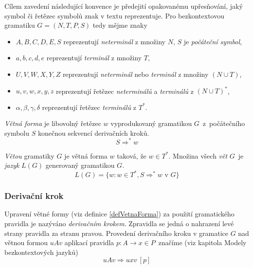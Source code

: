 \begin{konvence}
  Cílem zavedení následující konvence je předejití opakovanému upřesňování, jaký symbol či řetězec symbolů znak v textu reprezentuje.
  Pro bezkontextovou gramatiku $G = (N, T, P, S)$ tedy mějme znaky
  \begin{itemize}
    \item $A, B, C, D, E, S$ reprezentují \emph{neterminál} z množiny $N$, $S$ je \emph{počáteční symbol},
    \item $a, b, c, d, e$ reprezentují \emph{terminál} z množiny $T$,
    \item $U, V, W, X, Y, Z$ reprezentují \emph{neterminál} nebo \emph{terminál} z množiny $(N \cup T)$,
    \item $u, v, w, x, y, z$ reprezentují řetězec \emph{neterminálů} a \emph{terminálů} z $(N \cup T)^*$,
    \item $\alpha, \beta, \gamma, \delta$ reprezentují řetězec \emph{terminálů} z $T^*$.
  \end{itemize}
\end{konvence}

\begin{definice} \label{defVetnaForma}
  \emph{Větná forma} je libovolný řetězec $w$ vyprodukovaný gramatikou $G$~z~počátečního symbolu $S$ konečnou sekvencí derivačních kroků.
  $$S\Rightarrow^* w$$
\end{definice}

\begin{definice}
  \emph{Větou} gramatiky $G$ je větná forma $w$ taková, že $w \in T^*$. Množina všech \emph{vět}
  $G$~je \emph{jazyk} $L(G)$ generovaný gramatikou $G$.
  $$L(G) = \{w\!: w \in T^*, S \Rightarrow^* w \text{\ v\ } G\}$$
\end{definice}

\subsubsection{Derivační krok} \label{NadpisDerivacniKrok}
Upravení větné formy (viz definice \ref{defVetnaForma}) za použití gramatického pravidla je nazýváno \emph{derivačním krokem}. Zpravidla se jedná o nahrazení levé strany pravidla
za stranu pravou. Provedení derivačního kroku v gramatice $G$ nad větnou formou $u A v$ aplikací pravidla
$p\!: A \rightarrow x \in P$~značíme (viz \cite{IFJ:2017} kapitola Modely bezkontextových jazyků)
$$u A v \Rightarrow u x v\ [p]$$

